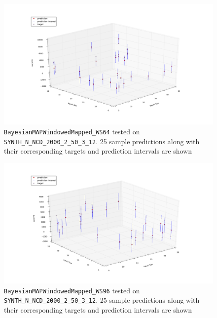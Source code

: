 \begin{figure}[htbp]
  \centering
    \includegraphics[width=\linewidth]{./Figures/sampled_25_predictions_bmap_mapped_ws64_SYNTH_D_NCD_2000_2_50_3_12.pdf}
  \caption{\texttt{BayesianMAPWindowedMapped\_WS64} tested on \texttt{SYNTH\_N\_NCD\_2000\_2\_50\_3\_12}. 25 sample predictions along with their corresponding targets and prediction intervals are shown}
 \label{fig:sampled_25_predictions_bmap_mapped_ws64_SYNTH_D_NCD_2000_2_50_3_12}
\end{figure}

\begin{figure}[htbp]
  \centering
    \includegraphics[width=\linewidth]{./Figures/sampled_25_predictions_bmap_mapped_ws96_SYNTH_D_NCD_2000_2_50_3_12.pdf}
  \caption{\texttt{BayesianMAPWindowedMapped\_WS96} tested on \texttt{SYNTH\_N\_NCD\_2000\_2\_50\_3\_12}. 25 sample predictions along with their corresponding targets and prediction intervals are shown}
 \label{fig:sampled_25_predictions_bmap_mapped_ws96_SYNTH_D_NCD_2000_2_50_3_12}
\end{figure}
 
